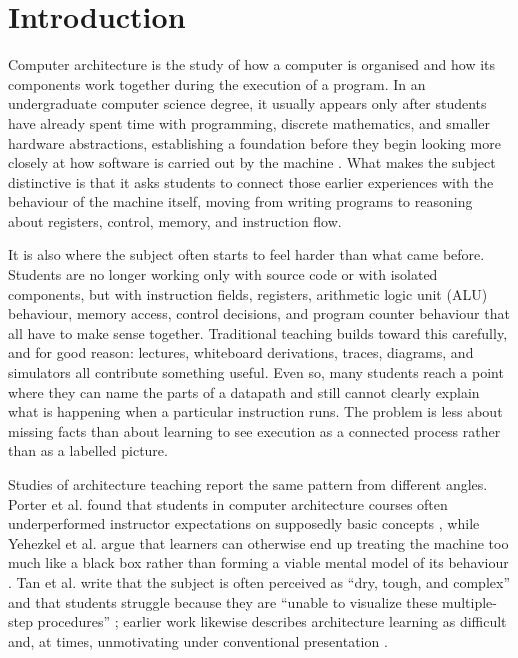 \chapter{Introduction}

Computer architecture is the study of how a computer is organised and how its components work together during the execution of a program. In an undergraduate computer science degree, it usually appears only after students have already spent time with programming, discrete mathematics, and smaller hardware abstractions, establishing a foundation before they begin looking more closely at how software is carried out by the machine \cite{tcdComputerScienceModules,tcdComputerArchitectureI,uarizonaBsStructure,uarizonaCsc252}. What makes the subject distinctive is that it asks students to connect those earlier experiences with the behaviour of the machine itself, moving from writing programs to reasoning about registers, control, memory, and instruction flow.

It is also where the subject often starts to feel harder than what came before. Students are no longer working only with source code or with isolated components, but with instruction fields, registers, arithmetic logic unit (ALU) behaviour, memory access, control decisions, and program counter behaviour that all have to make sense together. Traditional teaching builds toward this carefully, and for good reason: lectures, whiteboard derivations, traces, diagrams, and simulators all contribute something useful. Even so, many students reach a point where they can name the parts of a datapath and still cannot clearly explain what is happening when a particular instruction runs. The problem is less about missing facts than about learning to see execution as a connected process rather than as a labelled picture. 

Studies of architecture teaching report the same pattern from different angles. Porter et al. found that students in computer architecture courses often underperformed instructor expectations on supposedly basic concepts \cite{porter2013evaluating}, while Yehezkel et al. argue that learners can otherwise end up treating the machine too much like a black box rather than forming a viable mental model of its behaviour \cite{yehezkel2007contribution}. Tan et al. write that the subject is often perceived as ``dry, tough, and complex'' and that students struggle because they are ``unable to visualize these multiple-step procedures'' \cite{tan2023vr}; earlier work likewise describes architecture learning as difficult and, at times, unmotivating under conventional presentation \cite{tlili2016improving}.

